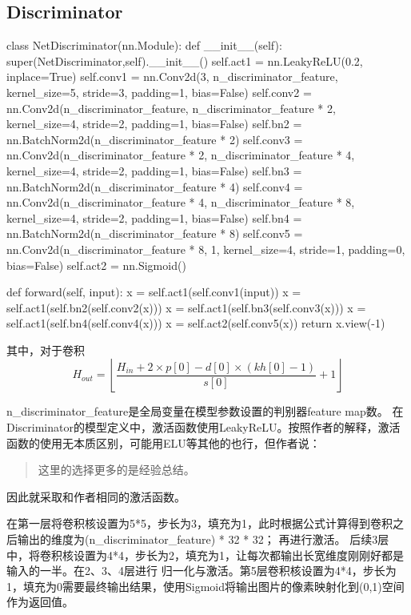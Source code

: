 \documentclass[a4paper,AutoFakeBold,AutoFakeSlant]{ctexart}
\begin{document}
\subsection{Discriminator}
\begin{python}
class NetDiscriminator(nn.Module):
  def __init__(self):
      super(NetDiscriminator,self).__init__()
      self.act1 = nn.LeakyReLU(0.2, inplace=True)
      self.conv1 = nn.Conv2d(3, n_discriminator_feature, kernel_size=5, stride=3, padding=1, bias=False)
      self.conv2 = nn.Conv2d(n_discriminator_feature, n_discriminator_feature * 2, kernel_size=4, stride=2, padding=1, bias=False)
      self.bn2 = nn.BatchNorm2d(n_discriminator_feature * 2)
      self.conv3 = nn.Conv2d(n_discriminator_feature * 2, n_discriminator_feature * 4, kernel_size=4, stride=2, padding=1, bias=False)
      self.bn3 = nn.BatchNorm2d(n_discriminator_feature * 4)
      self.conv4 = nn.Conv2d(n_discriminator_feature * 4, n_discriminator_feature * 8, kernel_size=4, stride=2, padding=1, bias=False)
      self.bn4 = nn.BatchNorm2d(n_discriminator_feature * 8)
      self.conv5 = nn.Conv2d(n_discriminator_feature * 8, 1, kernel_size=4, stride=1, padding=0, bias=False)
      self.act2 = nn.Sigmoid() 
      
  def forward(self, input):
      x = self.act1(self.conv1(input))
      x = self.act1(self.bn2(self.conv2(x)))
      x = self.act1(self.bn3(self.conv3(x)))
      x = self.act1(self.bn4(self.conv4(x)))
      x = self.act2(self.conv5(x))
      return x.view(-1)
\end{python}

其中，对于卷积
\begin{equation*}
  H_{out}=\left\lfloor\frac{H_{in }+2 \times p[0] - d[0] \times (kh[0] - 1)}{s[0]}+1 \right\rfloor
\end{equation*}

n\_discriminator\_feature是全局变量在模型参数设置的判别器feature map数。
在Discriminator的模型定义中，激活函数使用LeakyReLU。按照作者的解释，激活函数的使用无本质区别，可能用ELU等其他的也行，但作者说：
\begin{quote}
  这里的选择更多的是经验总结。\cite{GAN生成动漫头像}
\end{quote}
因此就采取和作者相同的激活函数。

在第一层将卷积核设置为5*5，步长为3，填充为1，此时根据公式计算得到卷积之后输出的维度为(n\_discriminator\_feature) * 32 * 32；
再进行激活。
后续3层中，将卷积核设置为4*4，步长为2，填充为1，让每次都输出长宽维度刚刚好都是输入的一半。在2、3、4层进行
归一化与激活。第5层卷积核设置为4*4，步长为1，填充为0需要最终输出结果，使用Sigmoid将输出图片的像素映射化到(0,1)空间作为返回值。
\end{document}
